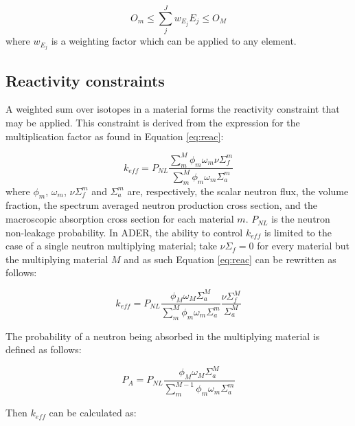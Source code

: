 \begin{equation}
\label{eq:oxi}
O_{m} \leq \sum \limits_{j}^{J} w_{E_{j}} E_{j} \leq O_{M}
\end{equation}
%
where  $w_{E_{j}}$ is a weighting
factor which can be applied to any element.


\subsection{Reactivity constraints} \label{ssec:reactivity}
A weighted sum over isotopes in a material forms the reactivity constraint that
may be applied. This constraint is derived from the expression for the 
multiplication factor as found in Equation \ref{eq:reac}:

\begin{equation}
\label{eq:reac}
k_{eff} = P_{NL} \frac{\sum\limits^{M}_{m}\phi_m\omega_m\nu\Sigma_{f}^{m}}
{\sum\limits^{M}_{m}\phi_m\omega_m   \Sigma_{a}^{m}}
\end{equation}
%
where $\phi_m$, $\omega_m$, $ \nu\Sigma_{f}^{m}$ and $ \Sigma_{a}^{m}$ are, 
respectively, the scalar neutron flux, the volume fraction, the spectrum 
averaged neutron production cross section, and the macroscopic absorption cross
section for each material $m$. $P_{NL}$ is the neutron non-leakage probability.
In ADER, the ability to control $k_{eff}$ is limited to the case of a single 
neutron multiplying material; take $\nu\Sigma_{f}=0$ for every material but the
multiplying material $M$ and as such Equation \ref{eq:reac} can be rewritten as
follows:

\begin{equation}
\label{eq:reac_one_material}
k_{eff} = P_{NL} \frac{\phi_M\omega_{M}\Sigma_{a}^{M}}{\sum\limits^{M}_{m}\phi_m\omega_m \Sigma_{a}^{m}} \frac{\nu\Sigma_{f}^{M}}{\Sigma_{a}^{M}}
\end{equation}

The probability of a neutron being absorbed in the multiplying material is 
defined as follows:

\begin{equation}
\label{eq:abs_prob}
P_{A} = P_{NL} \frac{\phi_M\omega_{M}\Sigma_{a}^{M}} {\sum\limits^{M-1}_{m}\phi_{m}\omega_m\Sigma_{a}^{m}}
\end{equation}

Then $k_{eff}$ can be calculated as:

